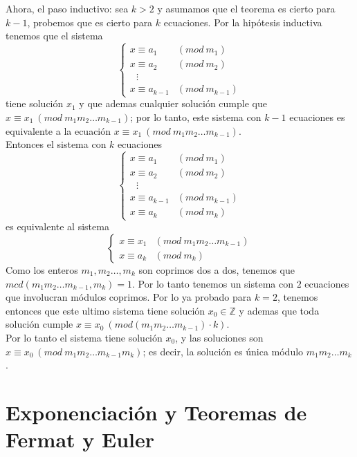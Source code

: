 \documentclass{report}
\begin{document}
\begin{myproof}
    Ahora, el paso inductivo: sea $k>2$ y asumamos que el teorema es cierto para $k-1$, probemos que es cierto para $k$ ecuaciones. Por la hipótesis inductiva tenemos que el sistema $$\begin{cases} x\equiv a_{1} & ( mod\ m_{1})\\ x\equiv a_{2} & ( mod\ m_{2})\\ \ \ \ \vdots  & \\ x\equiv a_{k-1} & ( mod\ m_{k-1}) \end{cases}$$ tiene solución $x_1$ y que ademas cualquier solución cumple que $x\equiv x_1\ (mod\ m_1m_2\dots m_{k-1})$; por lo tanto, este sistema con $k-1$ ecuaciones es equivalente a la ecuación $x\equiv x_1\ (mod\ m_1m_2\dots m_{k-1})$.\\Entonces el sistema con $k$ ecuaciones $$\begin{cases} x\equiv a_{1} & ( mod\ m_{1})\\ x\equiv a_{2} & ( mod\ m_{2})\\ \ \ \ \vdots  & \\ x\equiv a_{k-1} & ( mod\ m_{k-1})\\ x\equiv a_{k} & ( mod\ m_{k}) \end{cases}$$es equivalente al sistema $$\begin{cases} x\equiv x_{1} & ( mod\ m_{1} m_{2} \dotsc m_{k-1})\\ x\equiv a_{k} & ( mod\ m_{k}) \end{cases}$$Como los enteros $m_1,m_2\dots,m_k$ son coprimos dos a dos, tenemos que $mcd(m_1m_2\dots m_{k-1},m_k)=1$. Por lo tanto tenemos un sistema con $2$ ecuaciones que involucran módulos coprimos. Por lo ya probado para $k=2$, tenemos entonces que este ultimo sistema tiene solución $x_0\in\mathbb{Z}$ y ademas que toda solución cumple $x\equiv x_0\ (mod(m_1m_2\dots m_{k-1})\cdot k)$.\\Por lo tanto el sistema tiene solución $x_0$, y las soluciones son $x\equiv x_0\ (mod\ m_1m_2\dots m_{k-1}m_k)$; es decir, la solución es única módulo $m_1m_2\dots m_k$.
\end{myproof}
\newpage\section{Exponenciación y Teoremas de Fermat y Euler}
\end{document}
